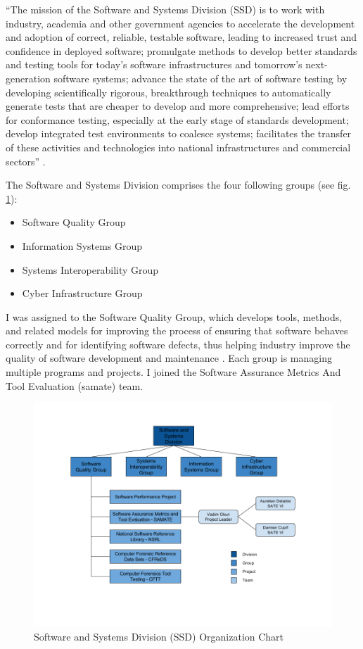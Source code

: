 ``The mission of the Software and Systems Division (SSD) is to work with industry, academia and other government agencies to accelerate the development and adoption of correct, reliable, testable software, leading to increased trust and confidence in deployed software; promulgate methods to develop better standards and testing tools for today's software infrastructures and tomorrow's next-generation software systems; advance the state of the art of software testing by developing scientifically rigorous, breakthrough techniques to automatically generate tests that are cheaper to develop and more comprehensive; lead efforts for conformance testing, especially at the early stage of standards development; develop integrated test environments to coalesce systems; facilitates the transfer of these activities and technologies into national infrastructures and commercial sectors'' \cite{nist2016ssdpresentation}.

The Software and Systems Division comprises the four following groups (see fig. \ref{fig:nist-division-organization-chart}):

\begin{itemize}
    \item Software Quality Group
    \item Information Systems Group
    \item Systems Interoperability Group
    \item Cyber Infrastructure Group
\end{itemize}

I was assigned to the Software Quality Group, which develops tools, methods, and related models for improving the process of ensuring that software behaves correctly and for identifying software defects, thus helping industry improve the quality of software development and maintenance \cite{nist2016ssdprojects}. Each group is managing multiple programs and projects. I joined the Software Assurance Metrics And Tool Evaluation (\gls{samate}) team.

\begin{figure}[ht]
  \centering
  \includegraphics[scale=0.48]{figures/nist-division-organization-chart}
  \caption{Software and Systems Division (SSD) Organization Chart}
  \label{fig:nist-division-organization-chart}
\end{figure}

